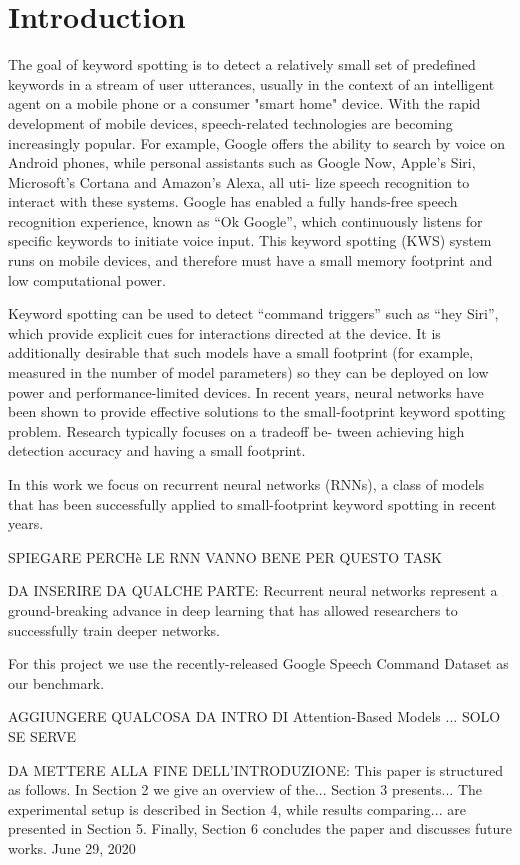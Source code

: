 \documentclass[conference]{IEEEtran}
\begin{document}
\section{Introduction}
The goal of keyword spotting is to detect a relatively small set of predefined keywords in a stream of user utterances, usually in the context of an intelligent agent on a mobile phone or a consumer "smart home" device. With the rapid development of mobile devices, speech-related technologies are becoming increasingly popular. For example, Google offers the ability to search by voice on Android phones, while personal assistants such as Google Now, Apple’s Siri, Microsoft’s Cortana and Amazon’s Alexa, all uti-
lize speech recognition to interact with these systems. Google has enabled a fully hands-free speech recognition experience, known as “Ok Google”, which continuously listens for specific keywords to initiate voice input. This keyword spotting (KWS) system runs on mobile devices, and therefore must have
a small memory footprint and low computational power.

Keyword spotting can be used to detect “command triggers” such as “hey Siri”, which provide explicit cues for interactions directed at the device. It is additionally desirable that such models have a small footprint (for example, measured in the number of model parameters) so they can be deployed on low power and performance-limited devices. In recent years, neural networks have been shown to provide effective solutions to the small-footprint keyword spotting problem. Research typically focuses on a tradeoff be-
tween achieving high detection accuracy and having a small footprint.

In this work we focus on recurrent neural networks (RNNs), a class of models that has been successfully applied to small-footprint keyword spotting in recent years.

SPIEGARE PERCHè LE RNN VANNO BENE PER QUESTO TASK

DA INSERIRE DA QUALCHE PARTE: Recurrent neural networks represent a ground-breaking advance in deep learning that has allowed researchers to successfully train deeper networks.

For this project we use the recently-released Google Speech Command Dataset as our benchmark.

AGGIUNGERE QUALCOSA DA INTRO DI Attention-Based Models ... SOLO SE SERVE

DA METTERE ALLA FINE DELL'INTRODUZIONE: This paper is structured as follows. In Section 2 we give an overview of the... Section 3 presents... The experimental setup is described in Section 4, while results comparing... are presented in Section 5. Finally, Section 6 concludes the paper and discusses future works. 
\hfill June 29, 2020
\end{document}
